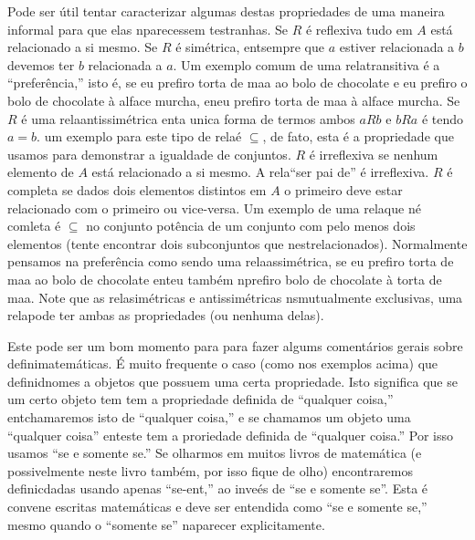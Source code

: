 Pode ser \'util  tentar caracterizar algumas destas propriedades de uma maneira informal para que elas n\ao parecessem t\ao estranhas. Se $R$ \'e reflexiva tudo em $A$ est\'a relacionado a si mesmo. Se $R$ \'e sim\'etrica, ent\ao sempre que $a$ estiver relacionada a $b$ devemos ter $b$ relacionada a $a$. Um exemplo comum de uma rela\cao transitiva \'e a ``prefer\^encia,'' isto \'e, se eu prefiro torta de ma\cc a ao bolo de chocolate e eu prefiro o bolo de chocolate \`a alface murcha, en\tao eu prefiro torta de ma\cc a \`a alface murcha. Se $R$ \'e uma rela\cao antissim\'etrica ent\ao a unica forma de termos ambos $aRb$ e $bRa$ \'e tendo $a=b$. um exemplo para este tipo de rela\cao \'e $\subseteq$, de fato, esta \'e a propriedade que usamos para demonstrar a igualdade de conjuntos. $R$ \'e irreflexiva se nenhum elemento de $A$ est\'a relacionado a si mesmo. A rela\cao ``ser pai de'' \'e irreflexiva. $R$ \'e completa se dados dois elementos distintos em $A$ o primeiro deve estar relacionado com o primeiro ou vice-versa. Um exemplo de uma rela\cao que n\ao \'e comleta \'e $\subseteq$ no conjunto pot\^encia de um conjunto com pelo menos dois elementos (tente encontrar dois subconjuntos que n\ao est\ao relacionados). Normalmente pensamos na prefer\^encia como sendo uma rela\cao assim\'etrica, se eu prefiro torta de ma\cc a ao bolo de chocolate ent\ao eu tamb\'em n\ao prefiro bolo de chocolate \`a torta de ma\cc a. Note que as rela\coes sim\'etricas e antissim\'etricas n\ao s\ao mutualmente exclusivas, uma rela\cao pode ter ambas as propriedades (ou nenhuma delas).

Este pode ser um bom momento para para fazer algums coment\'arios gerais sobre defini\coes matem\'aticas. \'E muito frequente o caso (como nos exemplos acima) que defini\coes d\ao nomes  a objetos que possuem uma certa propriedade. Isto significa que se um certo objeto tem tem a propriedade definida de ``qualquer coisa,'' ent\ao chamaremos isto de ``qualquer coisa,'' e se chamamos um objeto uma ``qualquer coisa'' ent\ao este tem a proriedade definida de ``qualquer coisa.'' Por isso usamos ``se e somente se.'' Se olharmos em muitos livros de matem\'atica (e possivelmente neste livro tamb\'em, por isso fique de olho) encontraremos definic\oes dadas usando apenas ``se-ent\aoi,'' ao inve\'es de ``se e somente se''. Esta \'e conven\cao e escritas matem\'aticas e deve ser entendida como ``se e somente se,'' mesmo quando o ``somente se'' n\ao aparecer explicitamente.

